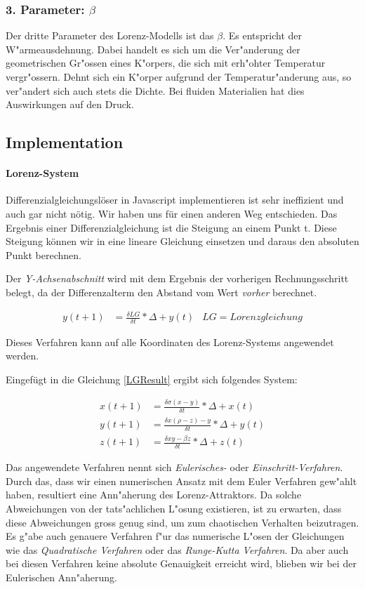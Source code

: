 \subsubsection{3. Parameter: $\beta$}
Der dritte Parameter des Lorenz-Modells ist das $\beta$. Es entspricht der W"armeausdehnung. Dabei handelt es sich um die Ver"anderung der geometrischen Gr"ossen eines K"orpers, die sich mit erh"ohter Temperatur vergr"ossern. Dehnt sich ein K"orper aufgrund der Temperatur"anderung aus, so ver"andert sich auch stets die Dichte. Bei fluiden Materialien hat dies Auswirkungen auf den Druck. 

\subsection{Implementation}

\paragraph{Lorenz-System}
Differenzialgleichungslöser in Javascript implementieren ist sehr ineffizient und auch gar nicht nötig. Wir haben uns für einen anderen Weg entschieden. Das Ergebnis einer Differenzialgleichung ist die Steigung an einem Punkt t. Diese Steigung können wir in eine lineare Gleichung einsetzen und daraus den absoluten Punkt berechnen.

Der \textit{Y-Achsenabschnitt} wird mit dem Ergebnis der vorherigen Rechnungsschritt belegt, da der Differenzalterm den Abstand vom Wert \textit{vorher} berechnet.  

\begin{align}
\label{LGResult}
y(t + 1) &= \frac{\delta LG}{\delta t} * \Delta + y(t) & LG = Lorenzgleichung
\end{align}

Dieses Verfahren kann auf alle Koordinaten des Lorenz-Systems angewendet werden.

Eingefügt in die Gleichung \eqref{LGResult} ergibt sich folgendes System:

\begin{centerFigure}
\begin{align}
x(t + 1) &= \frac{\delta \sigma(x - y)}{\delta t} * \Delta + x(t)\\
y(t + 1) &= \frac{\delta x(\rho - z) - y}{\delta t} * \Delta + y(t)\\
z(t + 1) &= \frac{\delta xy - \beta z}{\delta t} * \Delta + z(t)
\end{align}
\end{centerFigure}
Das angewendete Verfahren nennt sich \textit{Eulerisches-} oder \textit{Einschritt-Verfahren}. Durch das, dass wir einen numerischen Ansatz mit dem Euler Verfahren gew"ahlt haben, resultiert eine Ann"aherung des Lorenz-Attraktors. Da solche Abweichungen von der tats"achlichen L"osung existieren, ist zu erwarten, dass diese Abweichungen gross genug sind, um zum chaotischen Verhalten beizutragen. Es g"abe auch genauere Verfahren f"ur das numerische L"osen der Gleichungen wie das \textit{Quadratische Verfahren} oder das \textit{Runge-Kutta Verfahren}. Da aber auch bei diesen Verfahren keine absolute Genauigkeit erreicht wird, blieben wir bei der Eulerischen Ann"aherung. \\


